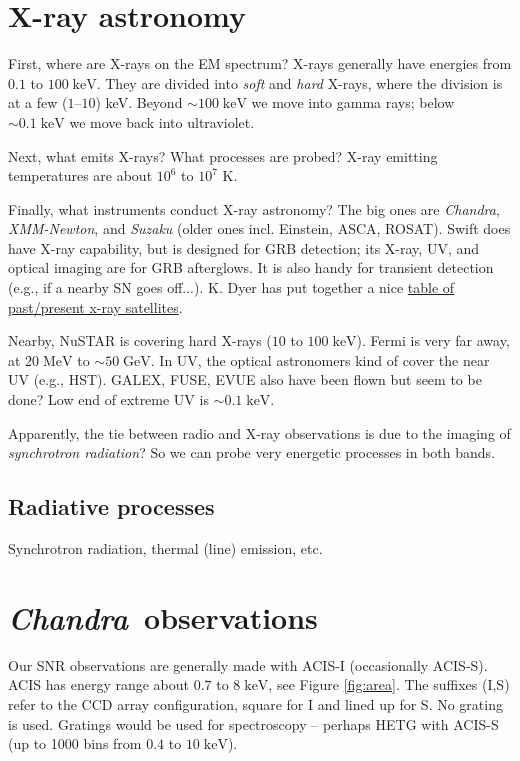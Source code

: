 \documentclass[10pt]{article}
\newcommand{\mt}{\mathrm}
\newcommand{\unit}[1]{\; \mt{#1}} %
\newcommand{\abt}{\mathord{\sim}} %
\newcommand{\Chandra}{\textit{Chandra}}
\begin{document}
\section{X-ray astronomy}

First, where are X-rays on the EM spectrum?  X-rays generally have energies
from $0.1$ to $100 \unit{keV}$.  They are divided into \emph{soft} and
\emph{hard} X-rays, where the division is at a few ($1$--$10$) keV.  Beyond
$\abt 100 \unit{keV}$ we move into gamma rays; below $\abt 0.1 \unit{keV}$ we
move back into ultraviolet.

Next, what emits X-rays?  What processes are probed?
X-ray emitting temperatures are about $10^6$ to $10^7$ K.

Finally, what instruments conduct X-ray astronomy? The big ones are \Chandra,
\emph{XMM-Newton}, and \emph{Suzaku} (older ones incl. Einstein, ASCA, ROSAT).
Swift does have X-ray capability, but is designed for GRB detection; its X-ray,
UV, and optical imaging are for GRB afterglows.  It is also handy for transient
detection (e.g., if a nearby SN goes off...).  K. Dyer has put together a nice
\href{http://www.aoc.nrao.edu/~kdyer/useful/sat.html}
{table of past/present x-ray satellites}.

Nearby, NuSTAR is covering hard X-rays ($10$ to $100\unit{keV}$).  Fermi is
very far away, at $20\unit{MeV}$ to $\abt 50\unit{GeV}$.  In UV, the optical
astronomers kind of cover the near UV (e.g., HST).  GALEX, FUSE, EVUE also have
been flown but seem to be done?  Low end of extreme UV is $\abt 0.1\unit{keV}$.

Apparently, the tie between radio and X-ray observations is due to the imaging
of \emph{synchrotron radiation}?  So we can probe very energetic processes in
both bands.

\subsection{Radiative processes}

Synchrotron radiation, thermal (line) emission, etc.


\section{\Chandra\ observations}

Our SNR observations are generally made with ACIS-I (occasionally ACIS-S).
ACIS has energy range about $0.7$ to $8 \unit{keV}$, see Figure \ref{fig:area}.
The suffixes (I,S) refer to the CCD array configuration, square for I and lined
up for S. No grating is used. Gratings would be used for spectroscopy --
perhaps HETG with ACIS-S (up to 1000 bins from $0.4$ to $10 \unit{keV}$).
\end{document}

